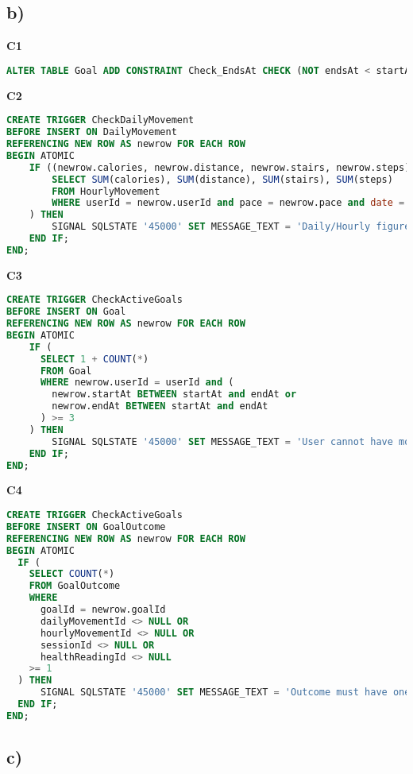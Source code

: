 \documentclass{article}
\begin{document}
\pagebreak
\subsection*{\small b)}

\textbf{\small{C1}}
\begin{lstlisting}[language=sql]
ALTER TABLE Goal ADD CONSTRAINT Check_EndsAt CHECK (NOT endsAt < startAt);
\end{lstlisting}
\textbf{\small{C2}}
\begin{lstlisting}[language=sql]
CREATE TRIGGER CheckDailyMovement
BEFORE INSERT ON DailyMovement
REFERENCING NEW ROW AS newrow FOR EACH ROW
BEGIN ATOMIC
    IF ((newrow.calories, newrow.distance, newrow.stairs, newrow.steps) <> (
        SELECT SUM(calories), SUM(distance), SUM(stairs), SUM(steps) 
        FROM HourlyMovement 
        WHERE userId = newrow.userId and pace = newrow.pace and date = newrow.date
    ) THEN
        SIGNAL SQLSTATE '45000' SET MESSAGE_TEXT = 'Daily/Hourly figures are not consistent';
    END IF;
END;
\end{lstlisting}
\textbf{\small{C3}}
\begin{lstlisting}[language=sql]
CREATE TRIGGER CheckActiveGoals
BEFORE INSERT ON Goal
REFERENCING NEW ROW AS newrow FOR EACH ROW
BEGIN ATOMIC
    IF ( 
      SELECT 1 + COUNT(*) 
      FROM Goal 
      WHERE newrow.userId = userId and (
        newrow.startAt BETWEEN startAt and endAt or 
        newrow.endAt BETWEEN startAt and endAt
      ) >= 3  
    ) THEN
        SIGNAL SQLSTATE '45000' SET MESSAGE_TEXT = 'User cannot have more than 3 active goals';
    END IF;
END;
\end{lstlisting}
\textbf{\small{C4}}
\begin{lstlisting}[language=sql]
CREATE TRIGGER CheckActiveGoals
BEFORE INSERT ON GoalOutcome
REFERENCING NEW ROW AS newrow FOR EACH ROW
BEGIN ATOMIC
  IF (  
    SELECT COUNT(*) 
    FROM GoalOutcome 
    WHERE 
      goalId = newrow.goalId
      dailyMovementId <> NULL OR 
      hourlyMovementId <> NULL OR 
      sessionId <> NULL OR 
      healthReadingId <> NULL
    >= 1
  ) THEN
      SIGNAL SQLSTATE '45000' SET MESSAGE_TEXT = 'Outcome must have one piece of evidence minimum';
  END IF;
END;
\end{lstlisting}

\pagebreak 

\subsection*{\small c)}
\end{document}
